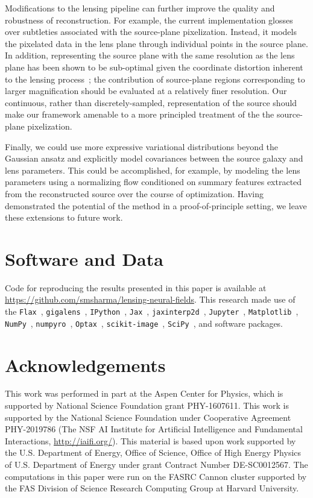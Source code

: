 \documentclass[nohyperref]{article}
\theoremstyle{plain}
\theoremstyle{definition}
\theoremstyle{remark}
\begin{document}
Modifications to the lensing pipeline can further improve the quality and robustness of reconstruction. For example, the current implementation glosses over subtleties associated with the source-plane pixelization. Instead, it models the pixelated data in the lens plane through individual points in the source plane. In addition, representing the source plane with the same resolution as the lens plane has been shown to be sub-optimal given the coordinate distortion inherent to the lensing process~\citep{warren2003semilinear}; the contribution of source-plane regions corresponding to larger magnification should be evaluated at a relatively finer resolution. Our {continuous}, rather than discretely-sampled, representation of the source should make our framework amenable to a more principled treatment of the the source-plane pixelization.

Finally, we could use more expressive variational distributions beyond the Gaussian ansatz and explicitly model covariances between the source galaxy and lens parameters. This could be accomplished, for example, by modeling the lens parameters using a normalizing flow conditioned on summary features extracted from the reconstructed source over the course of optimization. Having demonstrated the potential of the method in a proof-of-principle setting, we leave these extensions to future work.  

\section*{Software and Data}
Code for reproducing the results presented in this paper is available at \url{https://github.com/smsharma/lensing-neural-fields}. 
This research made use of the 
\texttt{Flax}~\citep{flax2020github}, 
\texttt{gigalens}~\citep{gu2022giga}, 
\texttt{IPython}~\cite{PER-GRA:2007},
\texttt{Jax}~\cite{jax2018github,deepmind2020jax},
\texttt{jaxinterp2d}~\cite{jaxinterp2dgithub},
\texttt{Jupyter}~\cite{Kluyver2016JupyterN},
\texttt{Matplotlib}~\cite{Hunter:2007},
\texttt{NumPy}~\cite{harris2020array},
\texttt{numpyro}~\cite{phan2019composable},
\texttt{Optax}~\citep{optax2020github},
\texttt{scikit-image}~\cite{scikit-image},
\texttt{SciPy}~\cite{2020SciPy-NMeth}, and
software packages.

\section*{Acknowledgements}

This work was performed in part at the Aspen Center for Physics, which is supported by National Science Foundation grant PHY-1607611.
This work is supported by the National Science Foundation under Cooperative Agreement PHY-2019786 (The NSF AI Institute for Artificial Intelligence and Fundamental Interactions, \url{http://iaifi.org/}).
This material is based upon work supported by the U.S. Department of Energy, Office of Science, Office of High Energy Physics of U.S. Department of Energy under grant Contract Number DE-SC0012567.
The computations in this paper were run on the FASRC Cannon cluster supported by the FAS Division of Science Research Computing Group at Harvard University.
\end{document}
